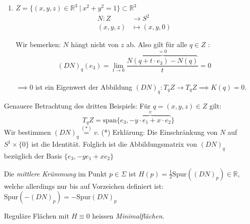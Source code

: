 \documentclass[../main.tex]{subfiles}
\begin{document}
\begin{examples}
\begin{enumerate}
        \item 

        \begin{minipage}[t]{0.6\columnwidth}
            $Z = \{ (x,y,z)\in \mathbb{R}^{3} \ | \ x^{2} + y^{2} = 1 \}\subset \mathbb{R}^3 $
            \begin{align*}
                N : Z &\to S^{2}\\
                (x,y,z) &\mapsto (x,y,0)
            \end{align*}
        \end{minipage}
        \begin{minipage}[t]{0.2\columnwidth}
            \begin{figure}[H]
                \centering
                \def\svgwidth{\textwidth}
                
            \end{figure}
        \end{minipage}

        Wir bemerken: $N$ hängt nicht von $z$ ab. 
        Also gilt für alle $q \in Z$ : $$(DN)_{q}(e_{3}) = \lim\limits_{t \rightarrow 0}{\frac{\overbrace{N(q + t \cdot e_{3}) - N(q)}^{=0}}{t}} = 0$$\\
        $\implies 0$ ist ein Eigenwert der Abbildung $(DN)_{q} : T_{q}Z \to T_{q}Z \implies K(q) = 0$.
    \end{enumerate}
    \begin{zusatz}
        Genauere Betrachtung des dritten Beispiels:
        Für $q = (x,y,z) \in Z$ gilt: $$T_{q}Z = \text{span}\{e_{3}, \overbrace{-y \cdot e_{1} + x \cdot e_{2}}^{v}\}$$
        Wir bestimmen $(DN)_{q}\stackrel{(\text{*})}{=} v$.
        (*) Erklärung: Die Einschränkung von $N$ auf $S^1\times \{0\}$ ist die Identität. Folglich ist die Abbildungsmatrix von $(DN)_{q}$ bezüglich der Basis $\{ e_{3}, -y e_{1} + x e_{2} \}$
    \end{zusatz}
\end{examples}
\begin{definition}
    Die \emph{mittlere Krümmung} im Punkt $p \in \Sigma$ ist $H(p) = \frac{1}{2} \text{Spur}((DN)_{p})\in \mathbb{R}$, welche allerdings nur bis auf Vorzeichen definiert ist:
    $\text{Spur}(-(DN)_{p}) = - \text{Spur}(DN)_{p}$

\end{definition}
\begin{remark}
    Reguläre Flächen mit $H \equiv 0$ heissen \emph{Minimalflächen}.
\end{remark}
\end{document}

